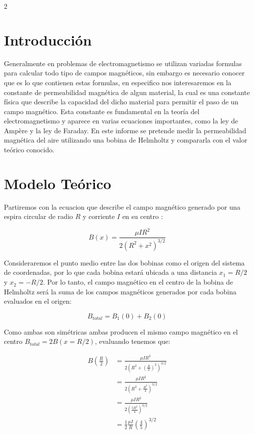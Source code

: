 \documentclass{article}
\begin{document}
\begin{multicols}{2}

\section*{Introducción}

    Generalmente en problemas de electromagnetismo se utilizan variadas formulas para calcular todo tipo de campos magnéticos,
    sin embargo es necesario conocer que es lo que contienen estas formulas, en especifico nos interesaremos en la constante
    de permeabilidad magnética de algun material, la cual es una constante física que describe la capacidad del dicho material
    para permitir el paso de un campo magnético. Esta constante es fundamental en la teoría del electromagnetismo y aparece en varias
    ecuaciones importantes, como la ley de Ampère y la ley de Faraday. En este informe se pretende medir la permeabilidad magnética del
    aire utilizando una bobina de Helmholtz y compararla con el valor teórico conocido.

\newpage

\section*{Modelo Teórico}

    Partiremos con la ecuacion que describe el campo magnético generado por una espira circular de radio $R$ y corriente $I$ en su
    centro \cite{Griffiths}:

        \begin{equation}
            B(x) = \frac{\mu I R^2}{2(R^2 + x^2)^{3/2}}
        \end{equation}

    Consideraremos el punto medio entre las dos bobinas como el origen del sistema de coordenadas, por lo que cada bobina estará
    ubicada a una distancia $x_1 = R/2$ y $x_2 = -R/2$. Por lo tanto, el campo magnético en el centro de la bobina de Helmholtz
    será la suma de los campos magnéticos generados por cada bobina evaluados en el origen:
        
        \begin{equation}
            B_{total} = B_1(0) + B_2(0)
        \end{equation}

    Como ambas son simétricas ambas producen el mismo campo magnético en el centro $B_{total} =2B(x=R/2)$, evaluando tenemos que:

        \begin{align}
            B(\frac{R}{2})  &= \frac{\mu I R^2}{2(R^2 + (\frac{R}{2})^2)^{3/2}} \\
                            &= \frac{\mu I R^2}{2(R^2 + \frac{R^2}{4})^{3/2}} \\
                            &= \frac{\mu I R^2}{2(\frac{5R^2}{4})^{3/2}} \\
                            &= \frac{1}{2} \frac{\mu I}{R} \left(\frac{4}{5}\right)^{3/2}
        \end{align}


\end{multicols}
\end{document}
